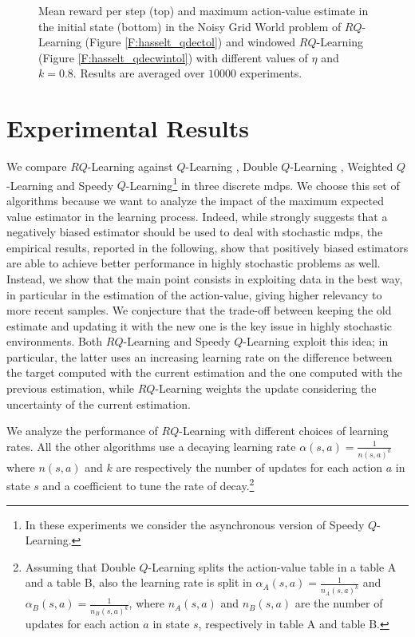 \begin{figure}[t]
\begin{minipage}{\columnwidth}
\end{minipage}
  \caption[Noisy grid world $RQ$-Learning variants comparison - 2]{Mean reward per step (top) and maximum action-value estimate in the initial state (bottom) in the Noisy Grid World problem of $RQ$-Learning (Figure \ref{F:hasselt_qdectol}) and windowed $RQ$-Learning (Figure \ref{F:hasselt_qdecwintol}) with different values of $\eta$ and $k = 0.8$. Results are averaged over $10000$ experiments.}
  \label{F:hasselt_QDecTol}
\end{figure}

\section{Experimental Results}\label{S:empirical}
We compare $RQ$-Learning against $Q$-Learning \cite{watkins1989learning}, Double $Q$-Learning \cite{van2010double}, Weighted $Q$-Learning \cite{deramo2016estimating} and Speedy $Q$-Learning\footnote{In these experiments we consider the asynchronous version of Speedy $Q$-Learning.} \cite{NIPS2011_4251} in three discrete \glspl{mdp}. We choose this set of algorithms because we want to analyze the impact of the maximum expected value estimator in the learning process. Indeed, while \cite{van2010double} strongly suggests that a negatively biased estimator should be used to deal with stochastic \glspl{mdp}, the  empirical results, reported in the following, show that positively biased estimators are able to achieve better performance in highly stochastic problems as well. Instead, we show that the main point consists in exploiting data in the best way, in particular in the estimation of the action-value, giving higher relevancy to more recent samples. We conjecture that the trade-off between keeping the old estimate and updating it with the new one is the key issue in highly stochastic environments. Both $RQ$-Learning and Speedy $Q$-Learning exploit this idea; in particular, the latter uses an increasing learning rate on the difference between the target computed with the current estimation and the one computed with the previous estimation, while $RQ$-Learning weights the update considering the uncertainty of the current estimation.

We analyze the performance of $RQ$-Learning with different choices of learning rates. All the other algorithms use a decaying learning rate $\alpha(s, a) = \frac{1}{n(s, a)^{k}}$ where $n(s, a)$ and $k$ are respectively the number of updates for each action $a$ in state $s$ and a coefficient to tune the rate of decay.\footnote{Assuming that Double $Q$-Learning splits the action-value table in a table A and a table B, also the learning rate is split in $\alpha_A(s, a) = \frac{1}{n_A(s, a)^{k}}$ and $\alpha_B(s, a) = \frac{1}{n_B(s, a)^{k}}$, where $n_A(s, a)$ and $n_B(s, a)$ are the number of updates for each action $a$ in state $s$, respectively in table A and table B.}

